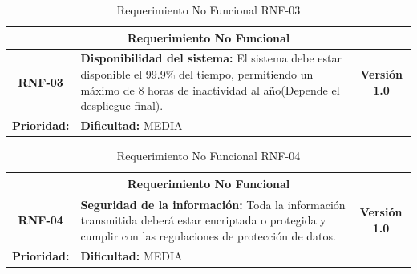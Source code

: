 \begin{table}[h]
\centering
\begin{tabular}{|c|p{10cm}|c|}
\hline
\multicolumn{3}{|c|}{\textbf{Requerimiento No Funcional}} \\ \hline
\textbf{RNF-03} & \textbf{Disponibilidad del sistema:} El sistema debe estar disponible el 99.9\% del tiempo, permitiendo un máximo de 8 horas de inactividad al año(Depende el despliegue final). & \textbf{Versión 1.0} \\ \hline
\multicolumn{1}{|l|}{\textbf{Prioridad:}} ALTA & \multicolumn{2}{l|}{\textbf{Dificultad:} MEDIA} \\ \hline
\end{tabular}
\caption{Requerimiento No Funcional RNF-03}
\end{table}
\vspace{1cm} %

\begin{table}[h]
\centering
\begin{tabular}{|c|p{10cm}|c|}
\hline
\multicolumn{3}{|c|}{\textbf{Requerimiento No Funcional}} \\ \hline
\textbf{RNF-04} & \textbf{Seguridad de la información:} Toda la información transmitida deberá estar encriptada o protegida y cumplir con las regulaciones de protección de datos. & \textbf{Versión 1.0} \\ \hline
\multicolumn{1}{|l|}{\textbf{Prioridad:}} ALTA & \multicolumn{2}{l|}{\textbf{Dificultad:} MEDIA} \\ \hline
\end{tabular}
\caption{Requerimiento No Funcional RNF-04}
\end{table}
